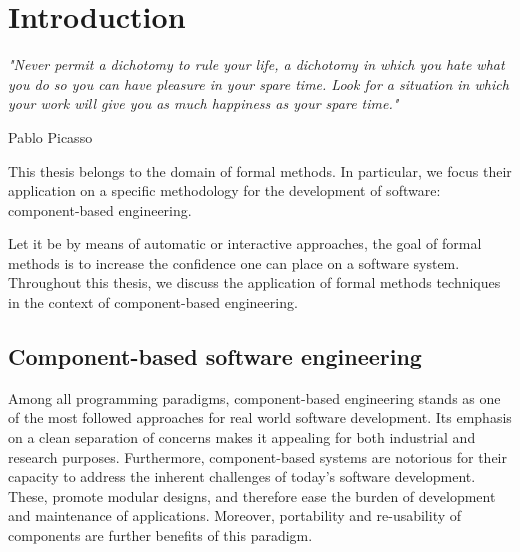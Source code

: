
\chapter{Introduction} 
\label{chap:intro} 
\epigraph{\textit{"Never permit a dichotomy to rule your life, a dichotomy in which you hate what you do so you can have pleasure in your spare time. Look for a situation in which your work will give you as much happiness as your spare time."}}{Pablo Picasso}

\minitoc




		This thesis belongs to the domain of formal methods. In particular, we focus 
		their application on a specific methodology
	for the development of software: component-based engineering. 
	
		Let it be by means of automatic or interactive approaches, the goal of formal methods
	is to increase the confidence one can place on a software system. Throughout this thesis, 	
	we discuss the application of formal methods techniques in the context of 
	component-based engineering.     	
	


\section{Component-based software engineering}
\label{sec:cbse}


	Among all programming paradigms, component-based engineering stands as one of the 
	most followed approaches for real world software development.  Its emphasis on a clean separation 
	of concerns makes it appealing for both industrial and research purposes.
	Furthermore, component-based systems are notorious for their capacity to address the inherent 
	challenges of today's software development.  These, promote modular designs,
	and therefore ease the burden of development and maintenance of applications. Moreover, portability 
	and re-usability of components are further benefits of this paradigm.

